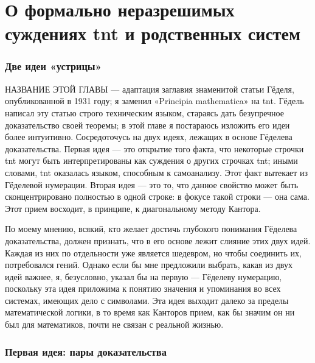 \documentclass[../main.tex]{subfiles}
\begin{document}
\def\ChapterName{О формально неразрешимых суждениях \acs{tnt} и родственных систем}
\chapter[\ChapterName]{\ChapterName\footnotemark}

\subsection{Две идеи «устрицы»}

НАЗВАНИЕ ЭТОЙ ГЛАВЫ --- адаптация заглавия знаменитой статьи Гёделя, опубликованной в 1931 году; я заменил «Principia mathematica» на \acs{tnt}\@. Гёдель написал эту статью строго техническим языком, стараясь дать безупречное доказательство своей теоремы; в этой главе я постараюсь изложить его идеи более интуитивно. Сосредоточусь на двух идеях, лежащих в основе Гёделева доказательства. Первая идея --- это открытие того факта, что некоторые строчки \acs{tnt} могут быть интерпретированы как суждения о других строчках \acs{tnt}; иными словами, \acs{tnt} оказалась языком, способным к самоанализу. Этот факт вытекает из Гёделевой нумерации. Вторая идея --- это то, что данное свойство может быть сконцентрировано полностью в одной строке: в фокусе такой строки --- она сама. Этот прием восходит, в принципе, к диагональному методу Кантора.

По моему мнению, всякий, кто желает достичь глубокого понимания Гёделева доказательства, должен признать, что в его основе лежит слияние этих двух идей. Каждая из них по отдельности уже является шедевром, но чтобы соединить их, потребовался гений. Однако если бы мне предложили выбрать, какая из двух идей важнее, я, безусловно, указал бы на первую --- Гёделеву нумерацию, поскольку эта идея приложима к понятию значения и упоминания во всех системах, имеющих дело с символами. Эта идея выходит далеко за пределы математической логики, в то время как Канторов прием, как бы значим он ни был для математиков, почти не связан с реальной жизнью.


\subsection{Первая идея: пары доказательства}
\end{document}

